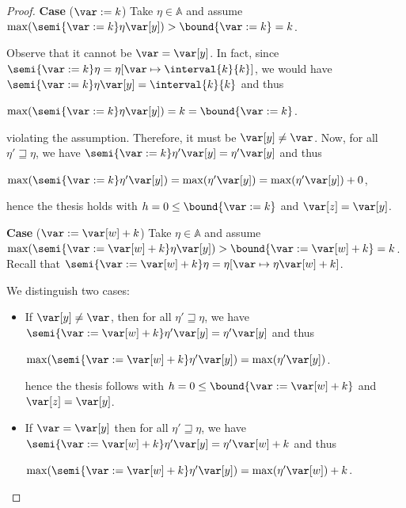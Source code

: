 \begin{proof}
  \medskip
  
  \noindent
  \textbf{Case} (\(\var := k\))
  Take \(\eta \in \mathbb{A}\) and assume
  \(\max(\semi{\var := k}\eta \var[y]) > \bound{\var := k} = k\).

  Observe that it cannot be \(\var = \var[y]\). In fact, since
  \(\semi{\var := k}\eta = \eta[\var \mapsto \interval{k}{k}]\), we would have
  \(\semi{\var := k}\eta \var[y] = \interval{k}{k}\) and thus
  \begin{center}
    \(\max(\semi{\var := k}\eta \var[y]) = k  = \bound{\var := k}\).
  \end{center}
  violating the assumption.
  Therefore, it must be \(\var[y] \neq \var\). Now, for all
  \(\eta' \sqsupseteq \eta\), we have
  \(\semi{\var := k}\eta' \var[y] = \eta' \var[y]\) and thus
  \begin{center}
    \(\max(\semi{\var := k}\eta' \var[y]) = \max(\eta' \var[y]) =
    \max(\eta' \var[y]) + 0\),
  \end{center}
  hence the thesis holds with \(h =0 \leq \bound{\var :=k}\) and \(\var[z] = \var[y]\).
  
  
  \medskip
  
  \noindent
  \textbf{Case} (\(\var := \var[w] + k\))
  Take \(\eta \in \mathbb{A}\) and assume
  \(\max(\semi{\var := \var[w] + k}\eta \var[y]) > \bound{\var := \var[w] + k} = k\).
  Recall that
  \(\semi{\var := \var[w] + k}\eta = \eta[\var \mapsto \eta \var[w] + k]\).
  
  We distinguish two cases:
  \begin{itemize}
    
  \item If \(\var[y] \neq \var\), then for all \(\eta' \sqsupseteq \eta\), we have
    \(\semi{\var := \var[w] + k}\eta' \var[y] = \eta' \var[y]\) and thus
    \begin{center}
      \(\max(\semi{\var := \var[w] + k}\eta' \var[y]) = \max(\eta' \var[y])\).
    \end{center}
    hence the thesis follows with
    \(h =0 \leq \bound{\var := \var[w] + k}\) and \(\var[z] = \var[y]\).
    
  \item 
    If \(\var = \var[y]\) then  for all \(\eta' \sqsupseteq \eta\), we have
    \(\semi{\var := \var[w] + k}\eta' \var[y] = \eta' \var[w] +
    k\) and thus
    \begin{center}
      \(\max(\semi{\var := \var[w] + k}\eta' \var[y]) = \max(\eta' \var[w]) +
      k\).
    \end{center}
    

\end{itemize}
\end{proof}
